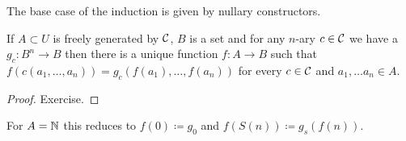 \begin{rem}
    The base case of the induction is given by nullary constructors.
\end{rem}

\begin{thm}
    If $A \subset U$ is freely generated by $\mathcal{C}$, $B$ is a set and for any $n$-ary $c \in \mathcal{C}$ we have a $g_c \colon B^n \to B$ then there is a unique function $f \colon A \to B$ such that $f(c(a_1, \dots, a_n)) = g_c(f(a_1), \dots, f(a_n))$ for every $c \in \mathcal{C}$ and $a_1, \dots a_n \in A$. 
\end{thm}
\begin{proof}
Exercise.
\end{proof}

\begin{example}
    For $A = \mathbb{N}$ this reduces to $f(0) \coloneq g_0$ and $f(S(n)) \coloneq g_s(f(n))$.
\end{example}